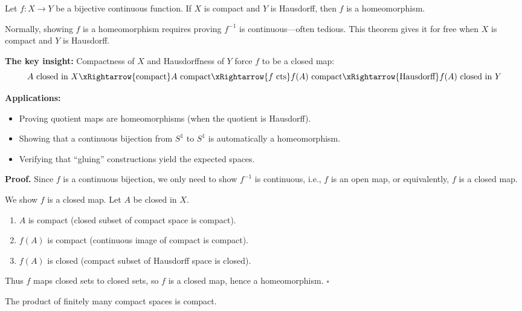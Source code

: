 \documentclass[11pt]{report}
\renewenvironment{proof}[1][Proof]{\noindent\textbf{#1.} }{\hfill$\square$\par\vspace{5pt}}
\begin{document}
\begin{thmbox}
Let $f: X \to Y$ be a bijective continuous function. If $X$ is compact and $Y$ is Hausdorff, then $f$ is a homeomorphism.
\end{thmbox}

\begin{rembox}
Normally, showing $f$ is a homeomorphism requires proving $f^{-1}$ is continuous---often tedious. This theorem gives it for free when $X$ is compact and $Y$ is Hausdorff.

\textbf{The key insight:} Compactness of $X$ and Hausdorffness of $Y$ force $f$ to be a closed map:
\[
A \text{ closed in } X \xRightarrow{\text{compact}} A \text{ compact} \xRightarrow{f \text{ cts}} f(A) \text{ compact} \xRightarrow{\text{Hausdorff}} f(A) \text{ closed in } Y
\]

\textbf{Applications:}
\begin{itemize}
    \item Proving quotient maps are homeomorphisms (when the quotient is Hausdorff).
    \item Showing that a continuous bijection from $S^1$ to $S^1$ is automatically a homeomorphism.
    \item Verifying that ``gluing'' constructions yield the expected spaces.
\end{itemize}
\end{rembox}

\begin{proof}
Since $f$ is a continuous bijection, we only need to show $f^{-1}$ is continuous, i.e., $f$ is an open map, or equivalently, $f$ is a closed map.

We show $f$ is a closed map. Let $A$ be closed in $X$.
\begin{enumerate}
    \item $A$ is compact (closed subset of compact space is compact).
    \item $f(A)$ is compact (continuous image of compact is compact).
    \item $f(A)$ is closed (compact subset of Hausdorff space is closed).
\end{enumerate}
Thus $f$ maps closed sets to closed sets, so $f$ is a closed map, hence a homeomorphism.
\end{proof}

\begin{thmbox}
The product of finitely many compact spaces is compact.
\end{thmbox}
\end{document}
